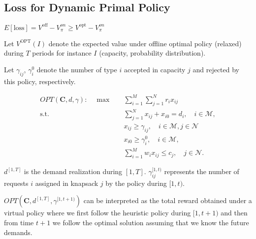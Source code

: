 



\subsection{Loss for Dynamic Primal Policy}

$E[\text{loss}] = V^{\text{off}} - V_{\pi}^{on} \geq V^{\text{opt}} - V_{\pi}^{on}$

Let $V^{\text{OPT}}(I)$ denote the expected value under offline optimal policy (relaxed) during $T$ periods for instance $I$ (capacity, probability distribution).


Let $\gamma_{ij}$, $\gamma_{i}^{0}$ denote the number of type $i$ accepted in capacity $j$ and rejected by this policy, respectively.


\begin{align*}
    OPT(\bm{C}, d, \gamma): \quad \max \quad & \sum_{i = 1}^{M} \sum_{j = 1}^{N} r_{i} x_{ij} \\
    \text {s.t.} \quad & \sum_{j=1}^{N} x_{ij} + x_{i0} = d_{i}, \quad i \in \mathcal{M},  \\ 
    & x_{ij} \geq \gamma_{ij}, \quad i \in \mathcal{M}, j \in \mathcal{N} \\
    & x_{i0} \geq \gamma_{i}^{0}, \quad i \in \mathcal{M}, \\
    & \sum_{i=1}^{M} w_{i} x_{ij} \leq c_{j}, \quad j \in \mathcal{N}.
\end{align*}




$d^{[1, T]}$ is the demand realization during $[1, T]$. $\gamma_{ij}^{[1, t)}$ represents the number of requests $i$ assigned in knapsack $j$ by the policy during $[1, t)$.

$OPT(\bm{C}, d^{[1, T]}, \gamma^{[1,t+1)})$ can be interpreted as the total reward obtained under a virtual policy where we first follow the heuristic policy during $[1, t+1)$ and then from time $t+1$ we follow the optimal solution assuming that we know the future demands.


